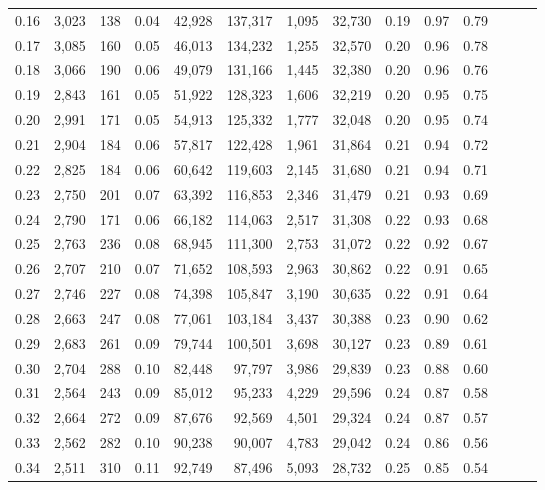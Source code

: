\begin{tabular}{rrrrrrrrrrrrrr}
0.16 &  3,023 &  138 &  0.04 &   42,928 &  137,317 &   1,095 &  32,730 &  0.19 &  0.97 &      0.79 \\
0.17 &  3,085 &  160 &  0.05 &   46,013 &  134,232 &   1,255 &  32,570 &  0.20 &  0.96 &      0.78 \\
0.18 &  3,066 &  190 &  0.06 &   49,079 &  131,166 &   1,445 &  32,380 &  0.20 &  0.96 &      0.76 \\
0.19 &  2,843 &  161 &  0.05 &   51,922 &  128,323 &   1,606 &  32,219 &  0.20 &  0.95 &      0.75 \\
0.20 &  2,991 &  171 &  0.05 &   54,913 &  125,332 &   1,777 &  32,048 &  0.20 &  0.95 &      0.74 \\
0.21 &  2,904 &  184 &  0.06 &   57,817 &  122,428 &   1,961 &  31,864 &  0.21 &  0.94 &      0.72 \\
0.22 &  2,825 &  184 &  0.06 &   60,642 &  119,603 &   2,145 &  31,680 &  0.21 &  0.94 &      0.71 \\
0.23 &  2,750 &  201 &  0.07 &   63,392 &  116,853 &   2,346 &  31,479 &  0.21 &  0.93 &      0.69 \\
0.24 &  2,790 &  171 &  0.06 &   66,182 &  114,063 &   2,517 &  31,308 &  0.22 &  0.93 &      0.68 \\
0.25 &  2,763 &  236 &  0.08 &   68,945 &  111,300 &   2,753 &  31,072 &  0.22 &  0.92 &      0.67 \\
0.26 &  2,707 &  210 &  0.07 &   71,652 &  108,593 &   2,963 &  30,862 &  0.22 &  0.91 &      0.65 \\
0.27 &  2,746 &  227 &  0.08 &   74,398 &  105,847 &   3,190 &  30,635 &  0.22 &  0.91 &      0.64 \\
0.28 &  2,663 &  247 &  0.08 &   77,061 &  103,184 &   3,437 &  30,388 &  0.23 &  0.90 &      0.62 \\
0.29 &  2,683 &  261 &  0.09 &   79,744 &  100,501 &   3,698 &  30,127 &  0.23 &  0.89 &      0.61 \\
0.30 &  2,704 &  288 &  0.10 &   82,448 &   97,797 &   3,986 &  29,839 &  0.23 &  0.88 &      0.60 \\
0.31 &  2,564 &  243 &  0.09 &   85,012 &   95,233 &   4,229 &  29,596 &  0.24 &  0.87 &      0.58 \\
0.32 &  2,664 &  272 &  0.09 &   87,676 &   92,569 &   4,501 &  29,324 &  0.24 &  0.87 &      0.57 \\
0.33 &  2,562 &  282 &  0.10 &   90,238 &   90,007 &   4,783 &  29,042 &  0.24 &  0.86 &      0.56 \\
0.34 &  2,511 &  310 &  0.11 &   92,749 &   87,496 &   5,093 &  28,732 &  0.25 &  0.85 &      0.54 \\

\end{tabular}
